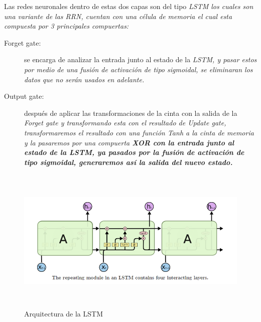         Las redes neuronales dentro de estas dos capas son del tipo \it{LSTM} los cuales son una variante de las \it{RRN}, cuentan con una célula de memoria el cual esta compuesta por 3 principales compuertas:
        
        
        \begin{description}
            \item [Forget gate:] se encarga de analizar la entrada junto al estado de la \it{LSTM}, y pasar estos por medio de una fusión de activación de tipo \it{sigmoidal}, se eliminaran los datos que no serán usados en adelante.
            \item [Output gate:] después de aplicar las transformaciones de la cinta con la salida de la \it{Forget gate} y transformando esta con el resultado de \it{Update gate}, transformaremos el resultado con una función \it{Tanh} a la cinta de memoria y la pasaremos por una compuerta \bf{XOR} con la entrada junto al estado de la \bf{LSTM}, ya pasados por la fusión de activación de tipo \it{sigmoidal}, generaremos así la salida del nuevo estado.
        \end{description}
        
          \begin{figure}[H]
             \centering
             \includegraphics[height=7cm, width=16.5cm]{Latex/Classes/Imagenes/LSTM.png}
             \caption{Arquitectura de la LSTM}
              \label{fig:infraestructuraExtraccionNLP}
        \end{figure}
        
